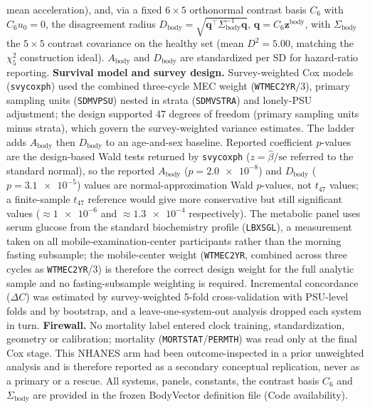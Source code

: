 \documentclass[11pt]{article}
\newcommand{\D}{\ensuremath{D}}
\newcommand{\A}{\ensuremath{A}}
\begin{document}
mean acceleration), and, via a fixed $6\times5$ orthonormal contrast basis $C_6$ with
$C_6u_0=0$, the disagreement radius
$\D_{\text{body}}=\sqrt{\mathbf{q}^{\top}\Sigma_{\text{body}}^{-1}\mathbf{q}}$,
$\mathbf{q}=C_6\mathbf{z}^{\text{body}}$, with $\Sigma_{\text{body}}$ the $5\times5$
contrast covariance on the healthy set (mean $\D^2=\num{5.00}$, matching the
$\chi^2_5$ construction ideal). $\A_{\text{body}}$ and $\D_{\text{body}}$ are standardized
per SD for hazard-ratio reporting. \textbf{Survival model and survey design.}
Survey-weighted Cox models (\texttt{svycoxph}) used the combined three-cycle MEC weight
(\texttt{WTMEC2YR}$/3$), primary sampling units (\texttt{SDMVPSU}) nested in strata
(\texttt{SDMVSTRA}) and lonely-PSU adjustment; the design supported \num{47} degrees of
freedom (primary sampling units minus strata), which govern the survey-weighted variance
estimates. The ladder adds $\A_{\text{body}}$ then $\D_{\text{body}}$ to an age-and-sex
baseline. Reported coefficient $p$-values are the design-based Wald tests returned by
\texttt{svycoxph} ($z=\hat\beta/\text{se}$ referred to the standard normal), so the reported
$\A_{\text{body}}$ ($p=\num{2.0e-8}$) and $\D_{\text{body}}$ ($p=\num{3.1e-5}$) values are
normal-approximation Wald $p$-values, not $t_{47}$ values; a finite-sample $t_{47}$ reference
would give more conservative but still significant values ($\approx\!\num{1e-6}$ and
$\approx\!\num{1.3e-4}$ respectively). The metabolic panel uses serum glucose from the
standard biochemistry profile (\texttt{LBXSGL}), a measurement taken on all
mobile-examination-center participants rather than the morning fasting subsample; the mobile-center
weight (\texttt{WTMEC2YR}, combined across three cycles as \texttt{WTMEC2YR}/3) is therefore
the correct design weight for the full analytic sample and no fasting-subsample weighting is
required. Incremental concordance ($\Delta C$) was estimated by
survey-weighted 5-fold cross-validation with PSU-level folds and by bootstrap, and a
leave-one-system-out analysis dropped each system in turn. \textbf{Firewall.} No mortality
label entered clock training, standardization, geometry or calibration; mortality
(\texttt{MORTSTAT}/\texttt{PERMTH}) was read only at the final Cox stage. This NHANES arm
had been outcome-inspected in a prior unweighted analysis and is therefore reported as a
secondary conceptual replication, never as a primary or a rescue. All systems, panels,
constants, the contrast basis $C_6$ and $\Sigma_{\text{body}}$ are provided in the frozen
BodyVector definition file (Code availability).
\end{document}
